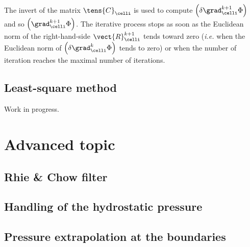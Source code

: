 The invert of the matrix $\tens{C}_{\celli}$ is used to compute $\left( \delta \grad_\celli^{k+1} \Phi \right)$ 
and so $\left( \grad^{k+1}_{\celli} \Phi \right)$. The iterative process stops as soon as the Euclidean norm of the right-hand-side $\vect{R}^{k+1}_{\celli}$ tends toward zero (\emph{i.e.} when the Euclidean norm
of $\left( \delta \grad^{k}_{\celli} \Phi \right)$ tends to zero) or when the number of iteration reaches the maximal number of iterations.




\subsection{Least-square method}
Work in progress.


\section{Advanced topic}

\subsection{Rhie \& Chow filter}


\subsection{Handling of the hydrostatic pressure}

\subsection{Pressure extrapolation at the boundaries}


